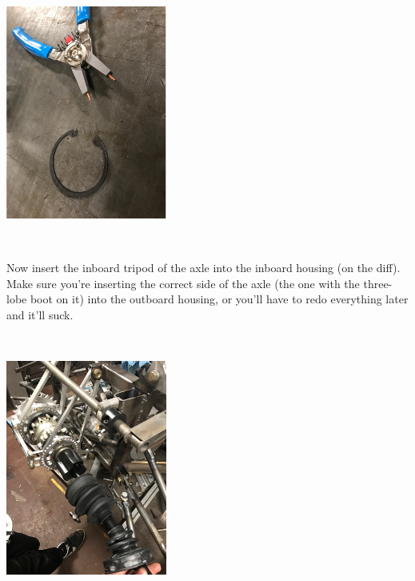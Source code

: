 \documentclass{article}
\begin{document}
\begin{minipage}{\linewidth}
$\,$

\begin{center}
\includegraphics[width = 150pt]{SnapRingOut.png}

\end{center}
$\,$
\end{minipage}

Now insert the inboard tripod of the axle into the inboard housing (on the diff). Make sure you're inserting the correct side of the axle (the one with the three-lobe boot on it) into the outboard housing, or you'll have to redo everything later and it'll suck.

\begin{minipage}{\linewidth}
$\,$

\begin{center}
\includegraphics[width = 150pt]{AxleHalfIn.png}

\end{center}
$\,$
\end{minipage}
\end{document}
